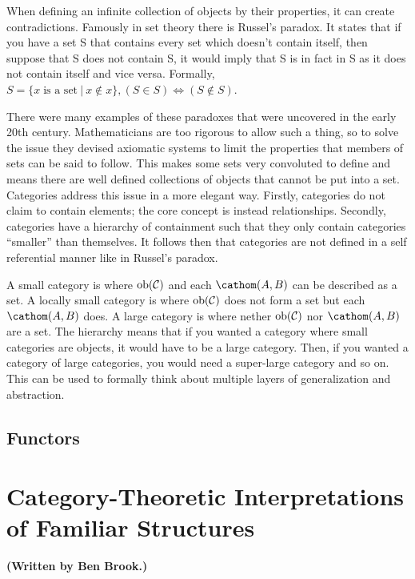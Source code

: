 \documentclass[10pt,a4paper,reqno]{amsart}
\begin{document}
When defining an infinite collection of objects by their properties, it can
create contradictions. Famously in set theory there is Russel's paradox.  It
states that if you have a set S that contains every set which doesn't contain
itself, then suppose that S does not contain S, it would imply that S is in fact
in S as it does not contain itself and vice versa.
Formally, $S = \{x\;\text{is a set}\:|\:x\notin x\}, (S\in S) \iff (S\notin S)$.

There were many examples of these paradoxes that were uncovered in the early
20th century. Mathematicians are too rigorous to allow such a thing, so to solve
the issue they devised axiomatic systems to limit the properties that members of
sets can be said to follow.  This makes some sets very convoluted to define and
means there are well defined collections of objects that cannot be put into a
set. Categories address this issue in a more elegant way.  Firstly, categories
do not claim to contain elements; the core concept is instead relationships.
Secondly, categories have a hierarchy of containment such that they only contain
categories ``smaller'' than themselves.  It follows then that categories are not
defined in a self referential manner like in Russel's paradox.

A small category is where $\operatorname{ob}(\mathcal{C})$ and each $\cathom(A,B)$ can be described as a set.
A locally small category is where $\operatorname{ob}(\mathcal{C})$ does not form a set but each
$\cathom(A,B)$ does.
A large category is where nether $\operatorname{ob}(\mathcal{C})$ nor $\cathom(A,B)$ are a set. The hierarchy
means that if you wanted a category where small categories are objects, it would
have to be a large category. Then, if you wanted a category of large categories,
you would need a super-large category and so on. This can be used to formally
think about multiple layers of generalization and abstraction.

\subsection{Functors}


\section{Category-Theoretic %
        Interpretations of Familiar Structures}
\begin{flushright}
        \textbf{(Written by Ben Brook.)}
\end{flushright}
\end{document}
